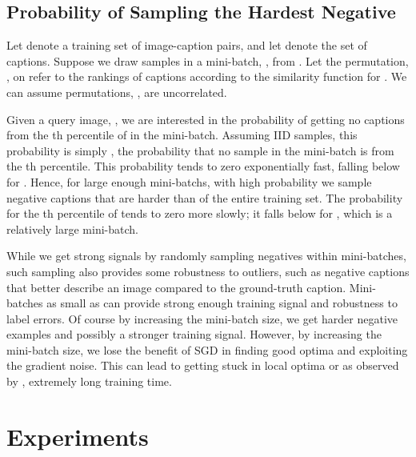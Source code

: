 \subsection{Probability of Sampling the Hardest Negative}
\label{sec:prob_hard_neg}

Let  denote a training set of image-caption pairs,
and let  denote the set of captions.  Suppose we draw  samples 
in a mini-batch, , from .  Let the permutation, 
, on  refer to the rankings of captions according to the similarity 
function  for . We can assume 
permutations, , are uncorrelated.

Given a query image, , we are interested in the probability of getting 
no captions from the th percentile of  in the mini-batch. 
Assuming IID samples, this probability is simply , the probability 
that no sample in the mini-batch is from the th percentile. 
This probability tends to zero exponentially fast, falling below  
for . Hence, for large enough mini-batchs, with high probability 
we sample negative captions that are harder 
than  of the entire training set.
The probability for the th percentile of  tends to zero 
more slowly; it falls below  for , which is a relatively 
large mini-batch. 

While we get strong signals  by randomly 
sampling negatives within mini-batches, such sampling also provides 
some robustness to outliers, such as negative captions that 
better describe an image compared to the ground-truth caption.
Mini-batches as small as  can provide strong 
enough training signal and robustness to label errors. Of course by 
increasing the mini-batch size, we get harder negative examples and possibly 
a stronger training signal.  However, by increasing the mini-batch size, we lose 
the benefit of SGD in finding good optima and exploiting the gradient noise.  
This can lead to getting stuck in local optima or as observed by 
\cite{schroff2015facenet}, extremely long training time.





 \section{Experiments}

